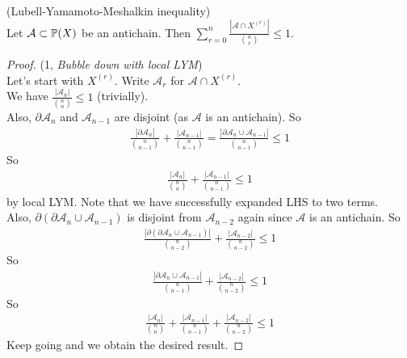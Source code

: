 \documentclass[a4paper]{article}
\begin{document}
\begin{thm} (Lubell-Yamamoto-Meshalkin inequality)\\
    Let $\mathcal{A} \subset \P(X)$ be an antichain. Then $\sum_{r=0}^n \frac{|\mathcal{A} \cap X^{(r)}|}{{n \choose r}} \leq 1$.
    \begin{proof} (1, \emph{Bubble down with local LYM})\\
        Let's start with $X^{(r)}$. Write $\mathcal{A}_r$ for $\mathcal{A} \cap X^{(r)}$.\\
        We have $\frac{|\mathcal{A}_n|}{{n\choose n}} \leq 1$ (trivially).\\
        Also, $\partial \mathcal{A}_n$ and $\mathcal{A}_{n-1}$ are disjoint (as $\mathcal{A}$ is an antichain). So 
        \begin{equation*}
        \begin{aligned}
            \frac{|\partial \mathcal{A}_n|}{{n \choose {n-1}}} + \frac{|\mathcal{A}_{n-1}|}{{n \choose {n-1}}} = \frac{|\partial \mathcal{A}_n \cup \mathcal{A}_{n-1}|}{{n \choose {n-1}}} \leq 1
        \end{aligned}
        \end{equation*}
        So
        \begin{equation*}
        \begin{aligned}
            \frac{|\mathcal{A}_n|}{{n \choose n}} + \frac{|\mathcal{A}_{n-1}|}{{n \choose {n-1}}} \leq 1
        \end{aligned}
        \end{equation*}
        by local LYM. Note that we have successfully expanded LHS to two terms.\\
        Also, $\partial (\partial \mathcal{A}_n \cup \mathcal{A}_{n-1})$ is disjoint from $\mathcal{A}_{n-2}$ again since $\mathcal{A}$ is an antichain. So 
        \begin{equation*}
            \begin{aligned}
                \frac{|\partial(\partial \mathcal{A}_n \cup \mathcal{A}_{n-1})|}{{n \choose {n-2}}} + \frac{|\mathcal{A}_{n-2}|}{{n \choose {n-2}}} \leq 1
            \end{aligned}
        \end{equation*}
        So
        \begin{equation*}
            \begin{aligned}
                \frac{|\partial \mathcal{A}_n \cup \mathcal{A}_{n-1}|}{{n \choose {n-1}}} + \frac{|\mathcal{A}_{n-2}|}{{n \choose {n-2}}} \leq 1
            \end{aligned}
        \end{equation*}
        So
        \begin{equation*}
            \begin{aligned}
                \frac{|\mathcal{A}_n|}{{n \choose {n}}} + \frac{|\mathcal{A}_{n-1}|}{{n \choose {n-1}}} + \frac{|\mathcal{A}_{n-2}|}{{n \choose {n-2}}} \leq 1
            \end{aligned}
        \end{equation*}
        Keep going and we obtain the desired result.
    \end{proof}
\end{thm}
\end{document}
